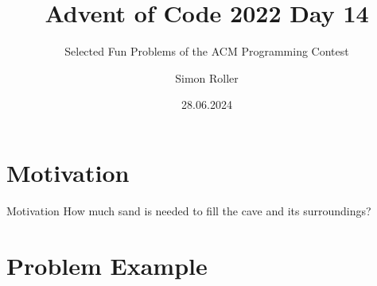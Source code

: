 \documentclass{beamer}
\title[Advent of Code 2022 Day 14]{Advent of Code 2022 Day 14}
\subtitle{Selected Fun Problems of the ACM Programming Contest}
\author{Simon Roller}
\institute{University of Tübingen}
\date{28.06.2024} %
\newcommand{\motivationTitle}{How much sand is needed to fill the cave and its surroundings?}
\begin{document}
\begin{frame}
    \titlepage
\end{frame}

\section{Motivation}

\begin{frame}{Motivation}
    \motivationTitle
    \begin{figure}[H]
        \centering
        
    \end{figure}
\end{frame}

\section{Problem Example}
\end{document}
